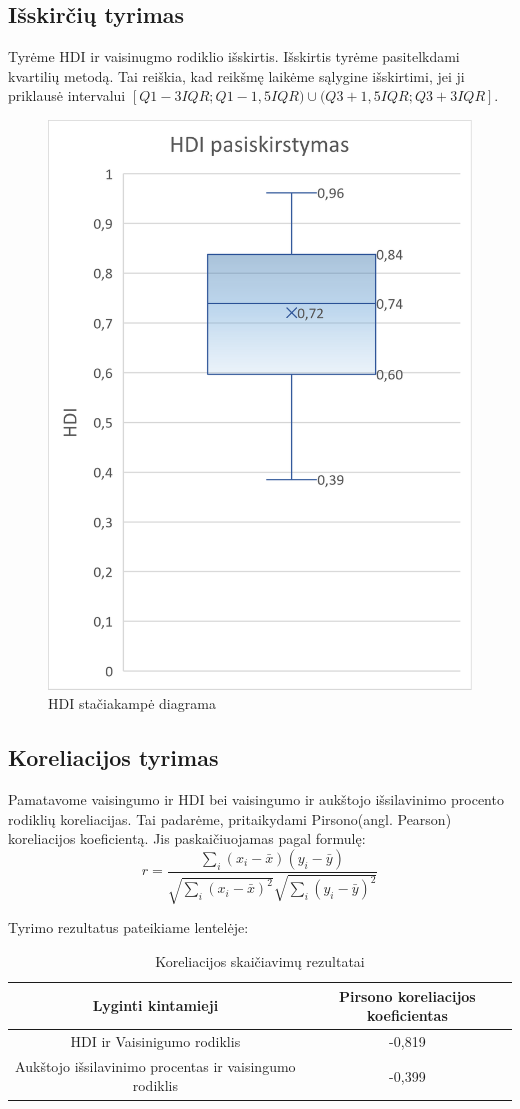 \subsection{Išskirčių tyrimas}
Tyrėme HDI ir vaisinugmo rodiklio išskirtis.
Išskirtis tyrėme pasitelkdami kvartilių metodą. Tai reiškia, kad reikšmę laikėme sąlygine išskirtimi, jei ji priklausė intervalui $[Q1-3IQR; Q1-1,5IQR) \cup (Q3+1,5IQR; Q3+3IQR]$.

\begin{figure}[H]
    \centering
    \includegraphics[width=.3\textwidth]{pic/box.png}
    \caption{HDI stačiakampė diagrama}
\end{figure}

\subsection{Koreliacijos tyrimas}
Pamatavome vaisingumo ir HDI bei vaisingumo ir aukštojo išsilavinimo procento rodiklių koreliacijas. Tai padarėme, pritaikydami Pirsono(angl. Pearson) koreliacijos koeficientą. Jis paskaičiuojamas pagal formulę: 
\begin{equation}
r = \frac{\sum\limits_i (x_i - \bar{x})(y_i - \bar{y})}{\sqrt{\sum\limits_i(x_i - \bar{x})^2}\sqrt{\sum\limits_i(y_i - \bar{y})^2}}
\end{equation}

Tyrimo rezultatus pateikiame lentelėje:
\begin{table}[H]
\begin{center}
    \begin{tabular}{|c|c|}
        \hline
        \textbf{Lyginti kintamieji} & \textbf{Pirsono koreliacijos koeficientas} \\\hline
        HDI ir Vaisinigumo rodiklis & -0,819 \\\hline
        Aukštojo išsilavinimo procentas ir vaisingumo rodiklis & -0,399 \\\hline
    \end{tabular}
    \caption{Koreliacijos skaičiavimų rezultatai}
\end{center}
\end{table}

